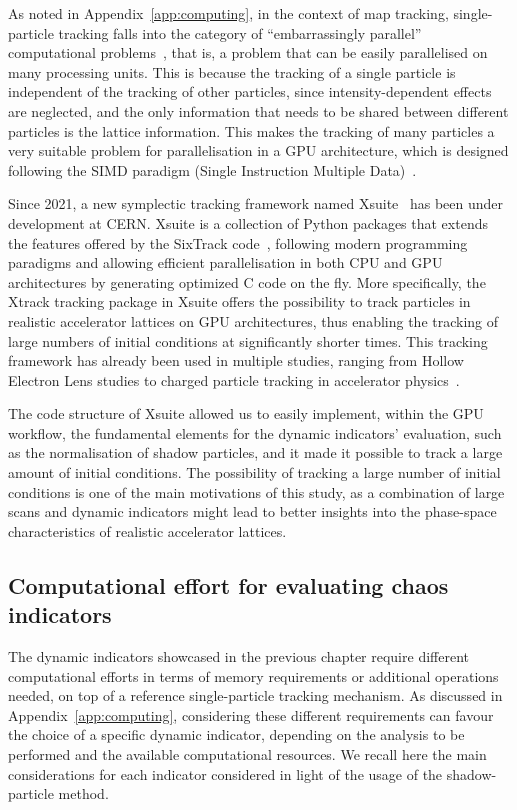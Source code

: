 As noted in Appendix~\ref{app:computing}, in the context of map tracking, single-particle tracking falls into the category of ``embarrassingly parallel'' computational problems~\cite{Giovannozzi:317866}, that is, a problem that can be easily parallelised on many processing units. This is because the tracking of a single particle is independent of the tracking of other particles, since intensity-dependent effects are neglected, and the only information that needs to be shared between different particles is the lattice information. This makes the tracking of many particles a very suitable problem for parallelisation in a GPU architecture, which is designed following the SIMD paradigm (Single Instruction Multiple Data)~\cite{DBLP:journals/corr/abs-1202-4347}.

Since 2021, a new symplectic tracking framework named Xsuite~\cite{xsuite} has been under development at CERN. Xsuite is a collection of Python packages that extends the features offered by the SixTrack code~\cite{De_Maria_2019}, following modern programming paradigms and allowing efficient parallelisation in both CPU and GPU architectures by generating optimized C code on the fly. More specifically, the Xtrack tracking package in Xsuite offers the possibility to track particles in realistic accelerator lattices on GPU architectures, thus enabling the tracking of large numbers of initial conditions at significantly shorter times. This tracking framework has already been used in multiple studies, ranging from Hollow Electron Lens studies to charged particle tracking in accelerator physics~\cite{pang2014gpu,oeftiger:hb16-mopr025,adelmann2019opal,schwinzerl:ipac21-thpab190,hermes:ipac2022-mopost045,iliakis2022enabling}.

The code structure of Xsuite allowed us to easily implement, within the GPU workflow, the fundamental elements for the dynamic indicators' evaluation, such as the normalisation of shadow particles, and it made it possible to track a large amount of initial conditions. The possibility of tracking a large number of initial conditions is one of the main motivations of this study, as a combination of large scans and dynamic indicators might lead to better insights into the phase-space characteristics of realistic accelerator lattices.
%
\subsection{Computational effort for evaluating chaos indicators}

The dynamic indicators showcased in the previous chapter require different computational efforts in terms of memory requirements or additional operations needed, on top of a reference single-particle tracking mechanism. As discussed in Appendix~\ref{app:computing}, considering these different requirements can favour the choice of a specific dynamic indicator, depending on the analysis to be performed and the available computational resources. We recall here the main considerations for each indicator considered in light of the usage of the shadow-particle method.

